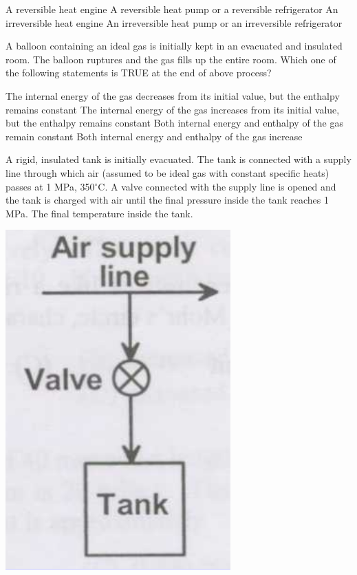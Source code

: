\documentclass[addpoints,11pt]{exam}
\begin{document}
\begin{questions}
        \begin{choices}
            \choice A reversible heat engine
            \choice A reversible heat pump or a reversible refrigerator
            \choice An irreversible heat engine
            \choice An irreversible heat pump or an irreversible refrigerator
        \end{choices}

        \question A balloon containing an ideal gas is initially kept in an evacuated and insulated room. The balloon ruptures and the gas fills up the entire room. Which one of the following statements is TRUE at the end of above process?\\

        \begin{choices}
            \choice The internal energy of the gas decreases from its initial value, but the enthalpy remains constant
            \choice The internal energy of the gas increases from its initial value, but the enthalpy remains constant
            \choice Both internal energy and enthalpy of the gas remain constant
            \choice Both internal energy and enthalpy of the gas increase
        \end{choices}

        \question A rigid, insulated tank is initially evacuated. The tank is connected with a supply line through which air (assumed to be ideal gas with constant specific heats) passes at 1 MPa, 350$^\circ$C. A valve connected with the supply line is opened and the tank is charged with air until the final pressure inside the tank reaches 1 MPa. The final temperature inside the tank.

        \begin{center}
            \includegraphics[scale=0.3]{q49}
        \end{center}


\end{questions}
\end{document}
